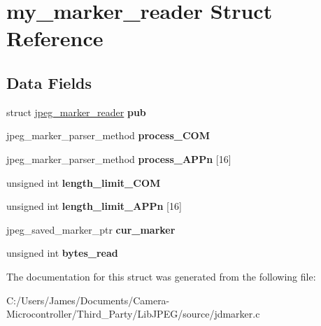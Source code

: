 \hypertarget{structmy__marker__reader}{}\section{my\+\_\+marker\+\_\+reader Struct Reference}
\label{structmy__marker__reader}
\subsection*{Data Fields}
\begin{DoxyCompactItemize}
\item 
\mbox{\label{structmy__marker__reader_aa158ea16ca3113a85dc7c75d65da9c28}} 
struct \hyperlink{structjpeg__marker__reader}{jpeg\+\_\+marker\+\_\+reader} {\bfseries pub}
\item 
\mbox{\label{structmy__marker__reader_ae5c391edb304a5863ec0dd17bfecb595}} 
jpeg\+\_\+marker\+\_\+parser\+\_\+method {\bfseries process\+\_\+\+C\+OM}
\item 
\mbox{\label{structmy__marker__reader_a474ae90c3ca320f62cdb384816158454}} 
jpeg\+\_\+marker\+\_\+parser\+\_\+method {\bfseries process\+\_\+\+A\+P\+Pn} \mbox{[}16\mbox{]}
\item 
\mbox{\label{structmy__marker__reader_a9a2bab947bcc758f5f1d1d758f314055}} 
unsigned int {\bfseries length\+\_\+limit\+\_\+\+C\+OM}
\item 
\mbox{\label{structmy__marker__reader_a4e37900862f99ad926b7b20dc098067c}} 
unsigned int {\bfseries length\+\_\+limit\+\_\+\+A\+P\+Pn} \mbox{[}16\mbox{]}
\item 
\mbox{\label{structmy__marker__reader_a118652071f1ba60c22bdaefaffcdb3d0}} 
jpeg\+\_\+saved\+\_\+marker\+\_\+ptr {\bfseries cur\+\_\+marker}
\item 
\mbox{\label{structmy__marker__reader_af8cba9d794f0bd09b487bb3131c881fc}} 
unsigned int {\bfseries bytes\+\_\+read}
\end{DoxyCompactItemize}


The documentation for this struct was generated from the following file\+:\begin{DoxyCompactItemize}
\item 
C\+:/\+Users/\+James/\+Documents/\+Camera-\/\+Microcontroller/\+Third\+\_\+\+Party/\+Lib\+J\+P\+E\+G/source/jdmarker.\+c\end{DoxyCompactItemize}
